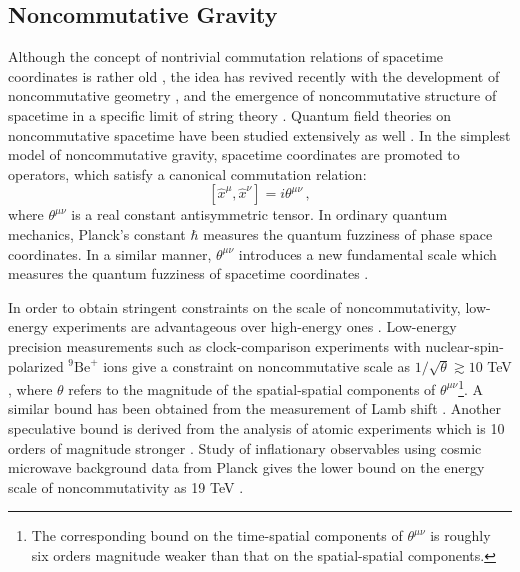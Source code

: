 \documentclass[prd,twocolumn,nofootinbib]{revtex4-1}
\newcommand\be{\begin{equation}}
\newcommand\ee{\end{equation}}
\begin{document}
 \subsection{Noncommutative Gravity}
Although the concept of nontrivial commutation relations of spacetime coordinates is rather old \cite{Snyder:1946qz,Snyder:1947nq}, the idea has revived recently with the development of noncommutative geometry \cite{connes1985non,connes1995noncommutative,1987117,Landi:1997sh,Woronowicz:1987vs}, and the emergence of noncommutative structure of spacetime in a specific limit of string theory \cite{WITTEN1986253,Seiberg:1999vs}. Quantum field theories on noncommutative spacetime have been studied extensively as well \cite{Douglas:2001ba,Rivelles:2002ez,Szabo:2001kg}. In the simplest model of  noncommutative gravity, spacetime coordinates are promoted to operators, which satisfy a canonical commutation relation:
\be
\left[\hat{x}^{\mu},\hat{x}^{\nu}\right]=i \theta^{\mu\nu}\,,
\ee
where $\theta^{\mu\nu}$ is a real constant antisymmetric tensor. In ordinary quantum mechanics, Planck's constant $\hbar$ measures the quantum fuzziness of phase space coordinates. In a similar manner, $\theta^{\mu\nu}$ introduces a new fundamental scale which measures the quantum fuzziness of spacetime coordinates \cite{Kobakhidze:2016cqh}.



In order to obtain stringent constraints on the scale of noncommutativity, low-energy experiments are advantageous over high-energy ones \cite{Carroll:2001ws,Mocioiu:2000ip}. Low-energy precision measurements such as clock-comparison experiments with nuclear-spin-polarized $_{}^{9}\textrm{Be}^+$ ions \cite{PhysRevLett.54.2387} give a constraint on noncommutative scale as $1/\sqrt{\theta}\gtrsim 10$ TeV \cite{Carroll:2001ws}, where $\theta$ refers to the magnitude of the spatial-spatial components of $\theta^{\mu\nu}$\footnote{The corresponding bound on the time-spatial components of $\theta^{\mu\nu}$ is roughly six orders magnitude weaker than that on the spatial-spatial components.}. A similar bound has been obtained from the measurement of Lamb shift \cite{PhysRevLett.86.2716}. Another speculative bound is derived from the analysis of atomic experiments which is 10 orders of magnitude stronger \cite{Berglund:1995zz,Mocioiu:2000ip}. Study of inflationary observables using cosmic microwave background data from Planck gives the lower bound on the energy scale of noncommutativity as  19 TeV \cite{calmet2015inflation,PhysRevD.91.083503}.
\end{document}
